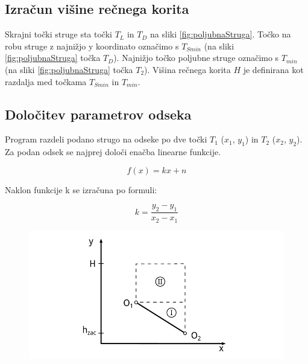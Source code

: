 \subsection{Izračun višine rečnega korita}
Skrajni točki struge sta točki $T_L$ in $T_D$ na sliki \ref{fig:poljubnaStruga}. Točko na robu struge z najnižjo y koordinato označimo s $T_{Smin}$ (na sliki \ref{fig:poljubnaStruga} točka $T_D$). Najnižjo točko poljubne struge označimo s $T_{min}$ (na sliki \ref{fig:poljubnaStruga} točka $T_2$). Višina rečnega korita $H$ je definirana kot razdalja med točkama $T_{Smin}$ in $T_{min}$.




\subsection{Določitev parametrov odseka}

Program razdeli podano strugo na odseke po dve točki $T_1$ ($x_1$, $y_1$) in $T_2$ ($x_2$, $y_2$). Za podan odsek se najprej določi enačba linearne funkcije. 

\begin{equation}
f(x) = kx + n \label{eq:enacba_linearnafunkcija}
\end{equation}

Naklon funkcije k se izračuna po formuli: 

\begin{equation}
k = \dfrac{y_2 - y_1}{x_2 - x_1}
\end{equation}



\begin{figure}[ht]
	\begin{centering}
		\includegraphics{slike/customChannel/odsek.pdf}
	\end{centering}
\end{figure}




